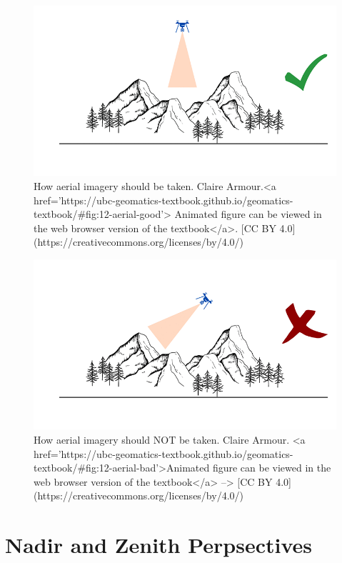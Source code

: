 \documentclass[
]{book}
\begin{document}
\begin{figure}
\includegraphics[width=0.9\linewidth]{images/12-aerial-good} \caption{How aerial imagery should be taken. Claire Armour.<a href='https://ubc-geomatics-textbook.github.io/geomatics-textbook/#fig:12-aerial-good'> Animated figure can be viewed in the web browser version of the textbook</a>. [CC BY 4.0](https://creativecommons.org/licenses/by/4.0/)}\label{fig:12-aerial-good}
\end{figure}

\begin{figure}
\includegraphics[width=0.9\linewidth]{images/12-aerial-bad} \caption{How aerial imagery should NOT be taken. Claire Armour.  <a href='https://ubc-geomatics-textbook.github.io/geomatics-textbook/#fig:12-aerial-bad'>Animated figure can be viewed in the web browser version of the textbook</a> --> [CC BY 4.0](https://creativecommons.org/licenses/by/4.0/)}\label{fig:12-aerial-bad}
\end{figure}

\hypertarget{nadir-and-zenith-perpsectives}{%
\section{Nadir and Zenith Perpsectives}\label{nadir-and-zenith-perpsectives}}
\end{document}
